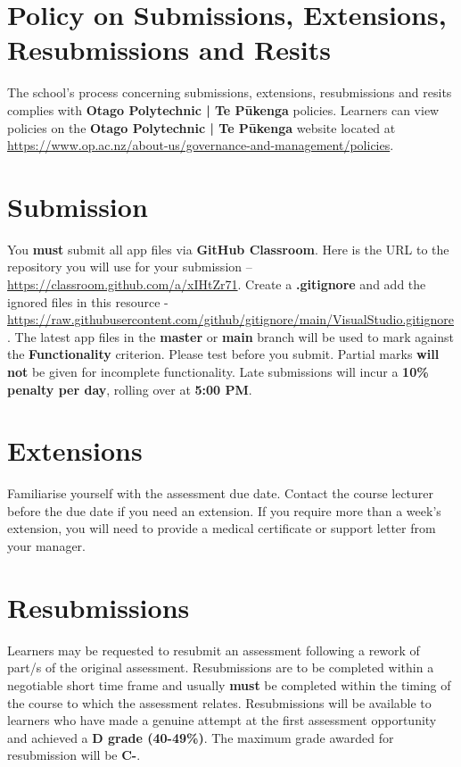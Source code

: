 \documentclass{article}
\begin{document}
\section*{Policy on Submissions, Extensions, Resubmissions and Resits}
The school's process concerning submissions, extensions, resubmissions and resits complies with \textbf{Otago Polytechnic | Te Pūkenga} policies. Learners can view policies on the \textbf{Otago Polytechnic | Te Pūkenga} website located at \href{https://www.op.ac.nz/about-us/governance-and-management/policies}{https://www.op.ac.nz/about-us/governance-and-management/policies}.

\section*{Submission}
You \textbf{must} submit all app files via \textbf{GitHub Classroom}. Here is the URL to the repository you will use for your submission – \href{https://classroom.github.com/a/xIHtZr71}{https://classroom.github.com/a/xIHtZr71}.  Create a \textbf{.gitignore} and add the ignored files in this resource - \href{https://raw.githubusercontent.com/github/gitignore/main/VisualStudio.gitignore}{https://raw.githubusercontent.com/github/gitignore/main/VisualStudio.gitignore}. The latest app files in the \textbf{master} or \textbf{main} branch will be used to mark against the \textbf{Functionality} criterion. Please test before you submit. Partial marks \textbf{will not} be given for incomplete functionality. Late submissions will incur a \textbf{10\% penalty per day}, rolling over at \textbf{5:00 PM}.

\section*{Extensions}
Familiarise yourself with the assessment due date. Contact the course lecturer before the due date if you need an extension. If you require more than a week's extension, you will need to provide a medical certificate or support letter from your manager.

\section*{Resubmissions}
Learners may be requested to resubmit an assessment following a rework of part/s of the original assessment. Resubmissions are to be completed within a negotiable short time frame and usually \textbf{must} be completed within the timing of the course to which the assessment relates. Resubmissions will be available to learners who have made a genuine attempt at the first assessment opportunity and achieved a \textbf{D grade (40-49\%)}. The maximum grade awarded for resubmission will be \textbf{C-}.
\end{document}
